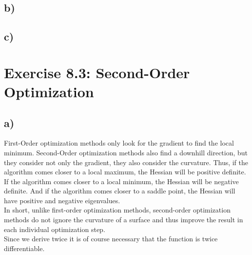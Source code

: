 \documentclass[a4paper]{article}
\begin{document}
    
    \subsection*{b)}
        


    \subsection*{c)}
        



\newpage
\section*{Exercise 8.3: Second-Order Optimization}
    \subsection*{a)}
        First-Order optimization methods only look for the gradient to find the local minimum.
        Second-Order optimization methods also find a downhill direction, but they consider not only the gradient, they also consider the curvature.
        Thus, if the algorithm comes closer to a local maximum, the Hessian will be positive definite.
        If the algorithm comes closer to a local minimum, the Hessian will be negative definite.
        And if the algorithm comes closer to a saddle point, the Hessian will have positive and negative eigenvalues.\\
        In short, unlike first-order optimization methods, second-order optimization methods do not ignore the curvature of a surface and thus improve the result in each individual optimization step.\\
        
        Since we derive twice it is of course necessary that the function is twice differentiable.
        
\end{document}

